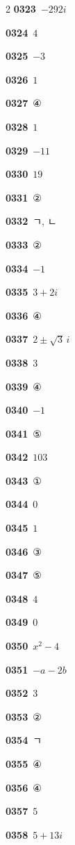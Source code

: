 \documentclass[10pt,a4paper]{article}
\begin{document}
\begin{multicols}{2}
\noindent\textbf{0323}\ $-292i$\par
\noindent\textbf{0324}\ $4$\par
\noindent\textbf{0325}\ $-3$\par
\noindent\textbf{0326}\ $1$\par
\noindent\textbf{0327}\ ④\par
\noindent\textbf{0328}\ $1$\par
\noindent\textbf{0329}\ $-11$\par
\noindent\textbf{0330}\ $19$\par
\noindent\textbf{0331}\ ②\par
\noindent\textbf{0332}\ ㄱ, ㄴ\par
\noindent\textbf{0333}\ ②\par
\noindent\textbf{0334}\ $-1$\par
\noindent\textbf{0335}\ $3+2i$\par
\noindent\textbf{0336}\ ④\par
\noindent\textbf{0337}\ $2\pm\sqrt{3}\,i$\par
\noindent\textbf{0338}\ $3$\par
\noindent\textbf{0339}\ ④\par
\noindent\textbf{0340}\ $-1$\par
\noindent\textbf{0341}\ ⑤\par
\noindent\textbf{0342}\ $103$\par
\noindent\textbf{0343}\ ①\par
\noindent\textbf{0344}\ $0$\par
\noindent\textbf{0345}\ $1$\par
\noindent\textbf{0346}\ ③\par
\noindent\textbf{0347}\ ⑤\par
\noindent\textbf{0348}\ $4$\par
\noindent\textbf{0349}\ $0$\par
\noindent\textbf{0350}\ $x^2-4$\par
\noindent\textbf{0351}\ $-a-2b$\par
\noindent\textbf{0352}\ $3$\par
\noindent\textbf{0353}\ ②\par
\noindent\textbf{0354}\ ㄱ\par
\noindent\textbf{0355}\ ④\par
\noindent\textbf{0356}\ ④\par
\noindent\textbf{0357}\ $5$\par
\noindent\textbf{0358}\ $5+13i$\par

\end{multicols}
\end{document}
